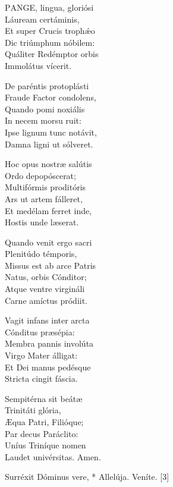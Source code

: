 
\lettrine[lines=2]{P}{ANGE}, lingua, gloriósi\\
Láuream certáminis,\\
Et super Crucis trophǽo\\
Dic triúmphum nóbilem:\\
Quáliter Redémptor orbis\\
Immolátus vícerit.

De paréntis protoplásti\\
Fraude Factor condolens,\\
Quando pomi noxiális\\
In necem morsu ruit:\\
Ipse lignum tunc notávit,\\
Damna ligni ut sólveret.

Hoc opus nostræ salútis\\
Ordo depopóscerat;\\
Multifórmis proditóris\\
Ars ut artem fálleret,\\
Et medélam ferret inde,\\
Hostis unde læserat.

Quando venit ergo sacri\\
Plenitúdo témporis,\\
Missus est ab arce Patris\\
Natus, orbis Cónditor;\\
Atque ventre virgináli\\
Carne amíctus pródiit.

Vagit infans inter arcta\\
Cónditus præsépia:\\
Membra pannis involúta\\
Virgo Mater álligat:\\
Et Dei manus pedésque\\
Stricta cingit fáscia.

Sempitérna sit beátæ\\
Trinitáti glória,\\
Æqua Patri, Filióque;\\
Par decus Paráclito:\\
Uníus Triníque nomen\\
Laudet univérsitas. Amen.


 Surréxit Dóminus vere, * Allelúja.  Veníte. [3]

